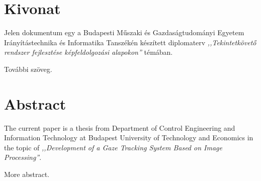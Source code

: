 \chapter*{Kivonat}

Jelen dokumentum egy a Budapesti Műszaki és Gazdaságtudományi Egyetem Irányítástechnika és Informatika Tanszékén készített diplomaterv \emph{,,Tekintetkövető rendszer fejlesztése képfeldolgozási alapokon''} témában. 

További szöveg.

\newpage

\chapter*{Abstract}

The current paper is a thesis from Department of Control Engineering and Information Technology at Budapest University of Technology and Economics in the topic of \emph{,,Development of a Gaze Tracking System Based on Image Processing''}. 

More abstract.

\vfill
